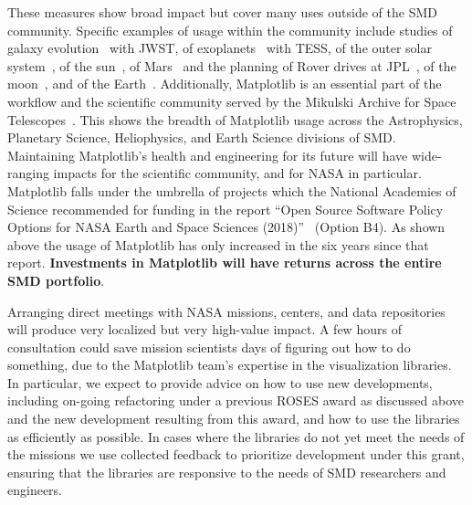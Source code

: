 \documentclass[12pt]{article}
\numberwithin{page}{section}
\begin{document}
These measures show broad impact but cover many uses outside of the
SMD community.  Specific examples of usage within the community include
studies of galaxy evolution~\cite{2022ApJ...940L..14N} with JWST,
of exoplanets~\cite{2020AJ....160..116G, Barclay_2018,2019AJ....158...27L} with TESS,
of the outer solar system~\cite{Emran_2023},
of the sun~\cite{Stangalini2022},
of Mars~\cite{2022JE007697} and the planning of Rover drives at JPL~\cite{acurtis},
of the moon~\cite{NESNAS2023163},
and of the Earth~\cite{paolo_2024}.
Additionally, Matplotlib is an essential part of the workflow and the
scientific community served by the Mikulski Archive for Space
Telescopes~\cite{Tollerud}.  This shows the breadth of Matplotlib usage across
the Astrophysics, Planetary Science, Heliophysics, and Earth Science divisions
of SMD.  Maintaining Matplotlib's health and engineering for its future will
have wide-ranging impacts for the scientific community, and for NASA in
particular.
Matplotlib falls under the umbrella of projects which the National Academies of
Science recommended for funding in the report ``Open Source Software Policy
Options for NASA Earth and Space Sciences (2018)''~\cite{NAP25217} (Option B4).
As shown above the usage of Matplotlib has only increased in the six years since
that report.  \textbf{Investments in Matplotlib will have returns across the
  entire SMD portfolio}.


Arranging direct meetings with NASA missions, centers, and data repositories
will produce very localized but very high-value impact.  A few hours of
consultation could save mission scientists days of figuring out how to do
something, due to the Matplotlib team's expertise in the visualization
libraries.  In particular, we expect to provide advice on how to use new
developments, including on-going refactoring under a previous ROSES award as
discussed above and the new development resulting from this award, and how to
use the libraries as efficiently as possible.  In cases where the libraries do
not yet meet the needs of the missions we use collected feedback to prioritize
development under this grant, ensuring that the libraries are responsive to the
needs of SMD researchers and engineers.
\end{document}
